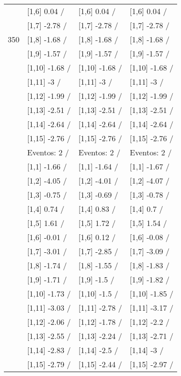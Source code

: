 \begin{table}
\begin{tabular}[t]{llll}
 & {}[1,6] 0.04  / & {}[1,6] 0.04  / & {}[1,6] 0.04  /\\
 & {}[1,7] -2.78  / & {}[1,7] -2.78  / & {}[1,7] -2.78  /\\
350 & {}[1,8] -1.68  / & {}[1,8] -1.68  / & {}[1,8] -1.68  /\\
\addlinespace
 & {}[1,9] -1.57  / & {}[1,9] -1.57  / & {}[1,9] -1.57  /\\
 & {}[1,10] -1.68  / & {}[1,10] -1.68  / & {}[1,10] -1.68  /\\
 & {}[1,11] -3  / & {}[1,11] -3  / & {}[1,11] -3  /\\
 & {}[1,12] -1.99  / & {}[1,12] -1.99  / & {}[1,12] -1.99  /\\
 & {}[1,13] -2.51  / & {}[1,13] -2.51  / & {}[1,13] -2.51  /\\
\addlinespace
 & {}[1,14] -2.64  / & {}[1,14] -2.64  / & {}[1,14] -2.64  /\\
 & {}[1,15] -2.76  / & {}[1,15] -2.76  / & {}[1,15] -2.76  /\\
 & Eventos:  2 / & Eventos:  2 / & Eventos:  2 /\\
 & {}[1,1] -1.66  / & {}[1,1] -1.64  / & {}[1,1] -1.67  /\\
 & {}[1,2] -4.05  / & {}[1,2] -4.01  / & {}[1,2] -4.07  /\\
\addlinespace
 & {}[1,3] -0.75  / & {}[1,3] -0.69  / & {}[1,3] -0.78  /\\
 & {}[1,4] 0.74  / & {}[1,4] 0.83  / & {}[1,4] 0.7  /\\
 & {}[1,5] 1.61  / & {}[1,5] 1.72  / & {}[1,5] 1.54  /\\
 & {}[1,6] -0.01  / & {}[1,6] 0.12  / & {}[1,6] -0.08  /\\
 & {}[1,7] -3.01  / & {}[1,7] -2.85  / & {}[1,7] -3.09  /\\
\addlinespace
500 & {}[1,8] -1.74  / & {}[1,8] -1.55  / & {}[1,8] -1.83  /\\
 & {}[1,9] -1.71  / & {}[1,9] -1.5  / & {}[1,9] -1.82  /\\
 & {}[1,10] -1.73  / & {}[1,10] -1.5  / & {}[1,10] -1.85  /\\
 & {}[1,11] -3.03  / & {}[1,11] -2.78  / & {}[1,11] -3.17  /\\
 & {}[1,12] -2.06  / & {}[1,12] -1.78  / & {}[1,12] -2.2  /\\
\addlinespace
 & {}[1,13] -2.55  / & {}[1,13] -2.24  / & {}[1,13] -2.71  /\\
 & {}[1,14] -2.83  / & {}[1,14] -2.5  / & {}[1,14] -3  /\\
 & {}[1,15] -2.79  / & {}[1,15] -2.44  / & {}[1,15] -2.97  /\\
\bottomrule
\end{tabular}
\end{table}
